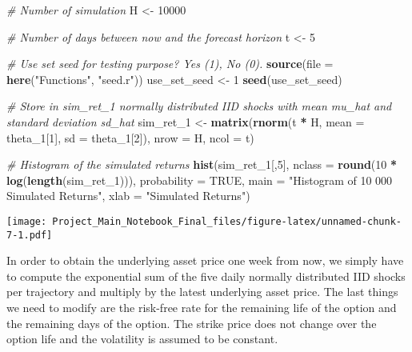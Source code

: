 \documentclass[]{article}
\newenvironment{Shaded}{\begin{snugshade}}{\end{snugshade}}
\newcommand{\CommentTok}[1]{\textcolor[rgb]{0.56,0.35,0.01}{\textit{#1}}}
\newcommand{\DataTypeTok}[1]{\textcolor[rgb]{0.13,0.29,0.53}{#1}}
\newcommand{\DecValTok}[1]{\textcolor[rgb]{0.00,0.00,0.81}{#1}}
\newcommand{\KeywordTok}[1]{\textcolor[rgb]{0.13,0.29,0.53}{\textbf{#1}}}
\newcommand{\NormalTok}[1]{#1}
\newcommand{\OperatorTok}[1]{\textcolor[rgb]{0.81,0.36,0.00}{\textbf{#1}}}
\newcommand{\OtherTok}[1]{\textcolor[rgb]{0.56,0.35,0.01}{#1}}
\newcommand{\StringTok}[1]{\textcolor[rgb]{0.31,0.60,0.02}{#1}}
\begin{document}
\begin{Shaded}
\begin{Highlighting}[]
\CommentTok{\# Number of simulation}
\NormalTok{H <{-}}\StringTok{ }\DecValTok{10000}

\CommentTok{\# Number of days between now and the forecast horizon}
\NormalTok{t <{-}}\StringTok{ }\DecValTok{5}

\CommentTok{\# Use set seed for testing purpose? Yes (1), No (0).}
\KeywordTok{source}\NormalTok{(}\DataTypeTok{file =} \KeywordTok{here}\NormalTok{(}\StringTok{"Functions"}\NormalTok{, }\StringTok{"seed.r"}\NormalTok{))}
\NormalTok{use\_set\_seed <{-}}\StringTok{ }\DecValTok{1}
\KeywordTok{seed}\NormalTok{(use\_set\_seed)}

\CommentTok{\# Store in \textquotesingle{}sim\_ret\_1\textquotesingle{} normally distributed IID shocks with mean \textquotesingle{}mu\_hat\textquotesingle{} and standard deviation \textquotesingle{}sd\_hat\textquotesingle{}}
\NormalTok{sim\_ret\_}\DecValTok{1}\NormalTok{ <{-}}\StringTok{ }\KeywordTok{matrix}\NormalTok{(}\KeywordTok{rnorm}\NormalTok{(t }\OperatorTok{*}\StringTok{ }\NormalTok{H, }\DataTypeTok{mean =}\NormalTok{ theta\_}\DecValTok{1}\NormalTok{[}\DecValTok{1}\NormalTok{], }\DataTypeTok{sd =}\NormalTok{ theta\_}\DecValTok{1}\NormalTok{[}\DecValTok{2}\NormalTok{]), }\DataTypeTok{nrow =}\NormalTok{ H, }\DataTypeTok{ncol =}\NormalTok{ t)}

\CommentTok{\# Histogram of the simulated returns}
\KeywordTok{hist}\NormalTok{(sim\_ret\_}\DecValTok{1}\NormalTok{[,}\DecValTok{5}\NormalTok{], }\DataTypeTok{nclass =} \KeywordTok{round}\NormalTok{(}\DecValTok{10} \OperatorTok{*}\StringTok{ }\KeywordTok{log}\NormalTok{(}\KeywordTok{length}\NormalTok{(sim\_ret\_}\DecValTok{1}\NormalTok{))),}
                \DataTypeTok{probability =} \OtherTok{TRUE}\NormalTok{,}
                \DataTypeTok{main =} \StringTok{"Histogram of 10 000 Simulated Returns"}\NormalTok{,}
                \DataTypeTok{xlab =} \StringTok{"Simulated Returns"}\NormalTok{)}
\end{Highlighting}
\end{Shaded}

\texttt{[image: Project\_Main\_Notebook\_Final\_files/figure-latex/unnamed-chunk-7-1.pdf]}

In order to obtain the underlying asset price one week from now, we
simply have to compute the exponential sum of the five daily normally
distributed IID shocks per trajectory and multiply by the latest
underlying asset price. The last things we need to modify are the
risk-free rate for the remaining life of the option and the remaining
days of the option. The strike price does not change over the option
life and the volatility is assumed to be constant.
\end{document}
